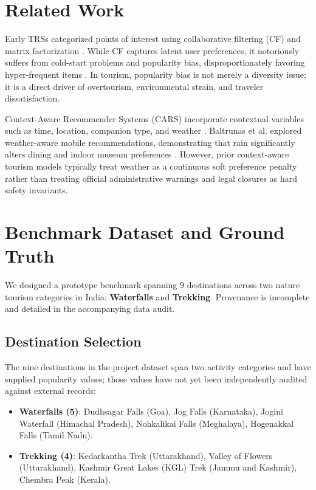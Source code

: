 \documentclass[conference]{IEEEtran}
\begin{document}
\section{Related Work}
Early TRSs categorized points of interest using collaborative filtering (CF) and matrix factorization \cite{koren2009}. While CF captures latent user preferences, it notoriously suffers from cold-start problems and popularity bias, disproportionately favoring hyper-frequent items \cite{abdollahpouri2017}. In tourism, popularity bias is not merely a diversity issue; it is a direct driver of overtourism, environmental strain, and traveler dissatisfaction.

Context-Aware Recommender Systems (CARS) incorporate contextual variables such as time, location, companion type, and weather \cite{adomavicius2011}. Baltrunas et al. explored weather-aware mobile recommendations, demonstrating that rain significantly alters dining and indoor museum preferences \cite{baltrunas2012}. However, prior context-aware tourism models typically treat weather as a continuous soft preference penalty rather than treating official administrative warnings and legal closures as hard safety invariants.

\section{Benchmark Dataset and Ground Truth}
We designed a prototype benchmark spanning 9 destinations across two nature tourism categories in India: \textbf{Waterfalls} and \textbf{Trekking}. Provenance is incomplete and detailed in the accompanying data audit.

\subsection{Destination Selection}
The nine destinations in the project dataset span two activity categories and have supplied popularity values; those values have not yet been independently audited against external records:
\begin{itemize}
    \item \textbf{Waterfalls (5)}: Dudhsagar Falls (Goa), Jog Falls (Karnataka), Jogini Waterfall (Himachal Pradesh), Nohkalikai Falls (Meghalaya), Hogenakkal Falls (Tamil Nadu).
    \item \textbf{Trekking (4)}: Kedarkantha Trek (Uttarakhand), Valley of Flowers (Uttarakhand), Kashmir Great Lakes (KGL) Trek (Jammu and Kashmir), Chembra Peak (Kerala).
\end{itemize}
\end{document}
